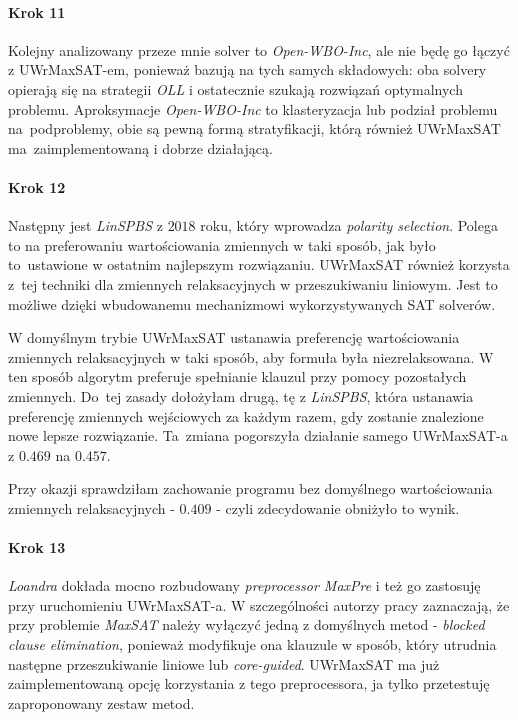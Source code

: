 \documentclass[shortabstract]{iithesis}
\begin{document}
\paragraph{Krok 11} Kolejny analizowany przeze mnie solver to \textit{Open-WBO-Inc}, ale nie będę go łączyć z UWrMaxSAT-em, ponieważ bazują na tych samych składowych: oba solvery opierają się na strategii \textit{OLL} i ostatecznie szukają rozwiązań optymalnych problemu. Aproksymacje \textit{Open-WBO-Inc} to klasteryzacja lub podział problemu na~podproblemy, obie są pewną formą stratyfikacji, którą również UWrMaxSAT ma~zaimplementowaną i dobrze działającą.

\paragraph{Krok 12}
Następny jest \textit{LinSPBS} z $2018$ roku, który wprowadza \textit{polarity selection}. 
Polega to na preferowaniu wartościowania zmiennych w taki sposób, jak było to~ustawione w ostatnim najlepszym rozwiązaniu. UWrMaxSAT również korzysta z~tej techniki dla zmiennych relaksacyjnych w przeszukiwaniu liniowym. Jest to możliwe dzięki wbudowanemu mechanizmowi wykorzystywanych SAT solverów.

W domyślnym trybie UWrMaxSAT ustanawia preferencję wartościowania zmiennych relaksacyjnych w taki sposób, aby formuła była niezrelaksowana. W ten sposób algorytm preferuje spełnianie klauzul przy pomocy pozostałych zmiennych. Do~tej zasady dołożyłam drugą, tę z \textit{LinSPBS}, która ustanawia preferencję zmiennych wejściowych za każdym razem, gdy zostanie znalezione nowe lepsze rozwiązanie. Ta~zmiana pogorszyła działanie samego UWrMaxSAT-a z $0.469$ na $0.457$.

Przy okazji sprawdziłam zachowanie programu bez domyślnego wartościowania zmiennych relaksacyjnych - $0.409$ - czyli zdecydowanie obniżyło to wynik.

\paragraph{Krok 13}
\textit{Loandra} dokłada mocno rozbudowany \textit{preprocessor MaxPre} i też go zastosuję przy uruchomieniu UWrMaxSAT-a. W szczególności autorzy pracy zaznaczają, że przy problemie \textit{MaxSAT} należy wyłączyć jedną z domyślnych metod - \textit{blocked clause elimination}, ponieważ modyfikuje ona klauzule w sposób, który utrudnia następne przeszukiwanie liniowe lub \textit{core-guided}. UWrMaxSAT ma już zaimplementowaną opcję korzystania z tego preprocessora, ja tylko przetestuję zaproponowany zestaw metod. 
\end{document}
